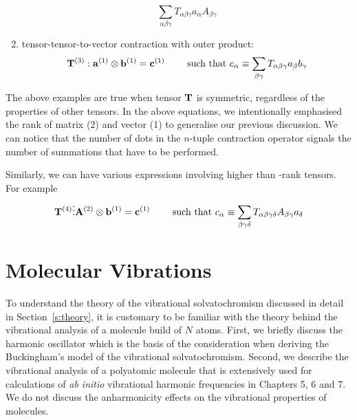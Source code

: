 \documentclass[a4paper,titlepage,twoside,fleqn,12pt]{book}
\begin{document}
\begin{appendices}
\begin{enumerate}
\begin{equation}
     \sum_{\alpha\beta\gamma} T_{\alpha\beta\gamma} a_{\alpha} A_{\beta\gamma}
   \end{equation}
 \item tensor\hyp{}tensor\hyp{}to\hyp{}vector contraction with outer product:
   \begin{equation}
     {\bf T}^{(3)} : {\bf a}^{(1)} \otimes {\bf b}^{(1)}  = {\bf c}^{(1)}
     \qquad\text{ such that } 
     c_{\alpha} \equiv 
     \sum_{\beta\gamma} T_{\alpha\beta\gamma} a_{\beta} b_{\gamma}
   \end{equation}
\end{enumerate}
%
The above examples are true when tensor ${\bf T}$ is symmetric, regardless
of the properties of other tensors. In the
above equations, we intentionally emphasised the rank of matrix (2)
and vector (1) to generalise our previous discussion.
We can notice that the number of dots in the $n$-tuple contraction operator
signals the number of summations that have to be performed. 

Similarly, we can have various expressions involving higher than \hyp{}rank
tensors. For example
   \begin{equation}
     {\bf T}^{(4)} \vdots {\bf A}^{(2)} \otimes {\bf b}^{(1)}  = {\bf c}^{(1)}
     \qquad\text{ such that } 
     c_{\alpha} \equiv 
     \sum_{\beta\gamma\delta} T_{\alpha\beta\gamma\delta} A_{\beta\gamma} a_{\delta}
   \end{equation}



\chapter{Molecular Vibrations\label{a:vibrational-analysis}}

To understand the theory of the vibrational solvatochromism 
discussed in detail in Section~\ref{s:theory}, it is customary
to be familiar with the theory behind the vibrational analysis
of a molecule build of $N$ atoms. First, we briefly discuss
the harmonic oscillator which is the basis of the consideration
when deriving the Buckingham's model of the vibrational solvatochromism.
Second, we describe the vibrational analysis of a polyatomic molecule
that is extensively used for calculations of \emph{ab initio} vibrational
harmonic frequencies in Chapters 5, 6 and 7. We do not discuss
the anharmonicity effects on the vibrational properties of molecules.


\end{appendices}
\end{document}
